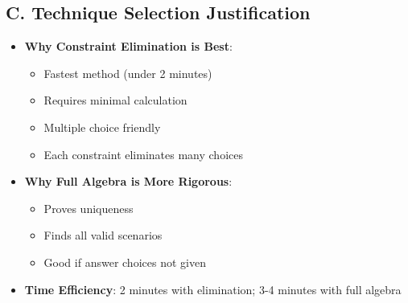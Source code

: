 \documentclass[12pt]{article}
\begin{document}
\begin{techniquesbox}
\subsection*{C. Technique Selection Justification}
\begin{itemize}[leftmargin=*]
    \item \textbf{Why Constraint Elimination is Best}: 
    \begin{itemize}
        \item Fastest method (under 2 minutes)
        \item Requires minimal calculation
        \item Multiple choice friendly
        \item Each constraint eliminates many choices
    \end{itemize}
    \item \textbf{Why Full Algebra is More Rigorous}:
    \begin{itemize}
        \item Proves uniqueness
        \item Finds all valid scenarios
        \item Good if answer choices not given
    \end{itemize}
    \item \textbf{Time Efficiency}: 2 minutes with elimination; 3-4 minutes with full algebra
\end{itemize}
\end{techniquesbox}
\end{document}
